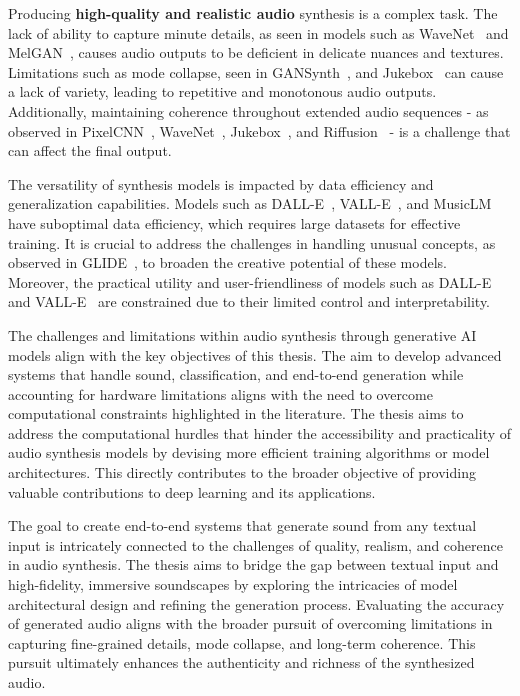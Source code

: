 Producing \textbf{high-quality and realistic audio} synthesis is a complex task. The lack of ability to capture minute details, as seen in models such as WaveNet~\cite{oord_wavenet_2016} and MelGAN~\cite{kumar_melgan_2019}, causes audio outputs to be deficient in delicate nuances and textures. Limitations such as mode collapse, seen in GANSynth~\cite{engel_gansynth_2019}, and Jukebox~\cite{dhariwal_jukebox_2020} can cause a lack of variety, leading to repetitive and monotonous audio outputs. Additionally, maintaining coherence throughout extended audio sequences - as observed in PixelCNN~\cite{oord_conditional_2016}, WaveNet~\cite{oord_wavenet_2016}, Jukebox~\cite{dhariwal_jukebox_2020}, and Riffusion~\cite{forsgren_riffusion_2022} - is a challenge that can affect the final output.

The versatility of synthesis models is impacted by data efficiency and generalization capabilities. Models such as DALL-E~\cite{ramesh_zero-shot_2021}, VALL-E~\cite{wang_neural_2023}, and MusicLM~\cite{agostinelli_musiclm_2023} have suboptimal data efficiency, which requires large datasets for effective training. It is crucial to address the challenges in handling unusual concepts, as observed in \ac{GLIDE}~\cite{nichol_glide_2021}, to broaden the creative potential of these models. Moreover, the practical utility and user-friendliness of models such as DALL-E~\cite{ramesh_zero-shot_2021} and VALL-E~\cite{wang_neural_2023} are constrained due to their limited control and interpretability.

The challenges and limitations within audio synthesis through generative \ac{AI} models align with the key objectives of this thesis. The aim to develop advanced systems that handle sound, classification, and end-to-end generation while accounting for hardware limitations aligns with the need to overcome computational constraints highlighted in the literature. The thesis aims to address the computational hurdles that hinder the accessibility and practicality of audio synthesis models by devising more efficient training algorithms or model architectures. This directly contributes to the broader objective of providing valuable contributions to deep learning and its applications.

The goal to create end-to-end systems that generate sound from any textual input is intricately connected to the challenges of quality, realism, and coherence in audio synthesis. The thesis aims to bridge the gap between textual input and high-fidelity, immersive soundscapes by exploring the intricacies of model architectural design and refining the generation process. Evaluating the accuracy of generated audio aligns with the broader pursuit of overcoming limitations in capturing fine-grained details, mode collapse, and long-term coherence. This pursuit ultimately enhances the authenticity and richness of the synthesized audio.

